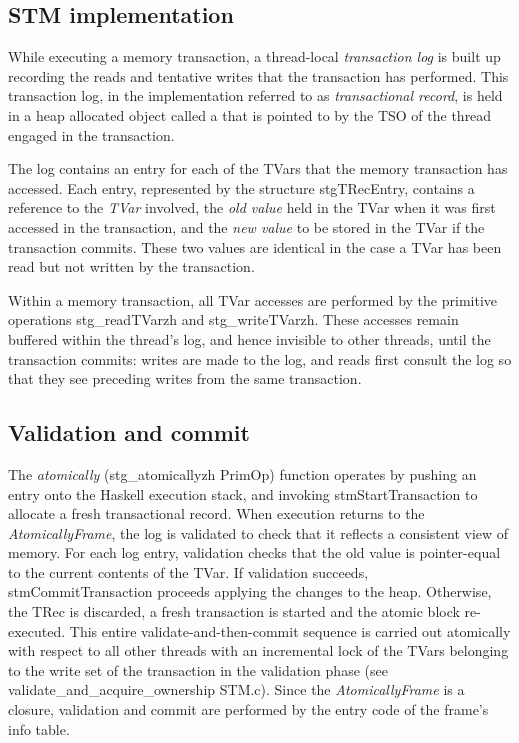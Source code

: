 \subsection{STM implementation}
While executing a memory transaction, a thread-local \emph{transaction log} is built up recording the reads and tentative writes that the transaction has performed. 
This transaction log, in the implementation referred to as \emph{transactional record}, is held in a heap allocated object called a  that is pointed to by the TSO of the thread engaged in the transaction.

The log contains an entry for each of the TVars that the memory transaction has accessed.
Each entry, represented by the structure stgTRecEntry, contains a reference to the \emph{TVar} involved, the \emph{old value} held in the TVar when it was first accessed in the transaction, and the \emph{new value} to be stored in the TVar if the transaction commits.
These two values are identical in the case a TVar has been read but not written by the transaction.

Within a memory transaction, all TVar accesses are performed by the primitive operations stg\_readTVarzh and stg\_writeTVarzh. These accesses remain buffered within the thread’s log, and hence invisible to other threads, until the transaction commits: writes are made to the log, and reads first consult the log so that they see preceding writes from the same transaction.

\subsection{Validation and commit}
The \emph{atomically} (stg\_atomicallyzh PrimOp) function operates by pushing an  entry onto the Haskell execution stack, and invoking stmStartTransaction to allocate a fresh transactional record.
When execution returns to the \emph{AtomicallyFrame}, the log is validated to check that it reflects a consistent view of memory.
For each log entry, validation checks that the old value is pointer-equal to the current contents of the TVar.
If validation succeeds, stmCommitTransaction proceeds applying the changes to the heap. Otherwise, the TRec is discarded, a fresh transaction is started and the atomic block re-executed.
This entire validate-and-then-commit sequence is carried out atomically with respect to all other threads with an incremental lock of the TVars belonging to the write set of the transaction in the validation phase (see validate\_and\_acquire\_ownership STM.c).
Since the \emph{AtomicallyFrame} is a closure, validation and commit are performed by the entry code of the frame's info table.

